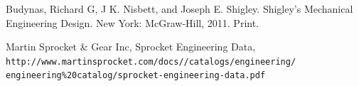 \documentclass[letterpaper,12pt]{article}
\begin{document}
\begin{thebibliography}{9}
Budynas, Richard G, J K. Nisbett, and Joseph E. Shigley. Shigley's Mechanical Engineering Design. New York: McGraw-Hill, 2011. Print. 

Martin Sprocket \& Gear Inc, Sprocket Engineering Data,
\\\texttt{http://www.martinsprocket.com/docs//catalogs/engineering/\\engineering\%20catalog/sprocket-engineering-data.pdf}
\end{thebibliography}
\end{document}
